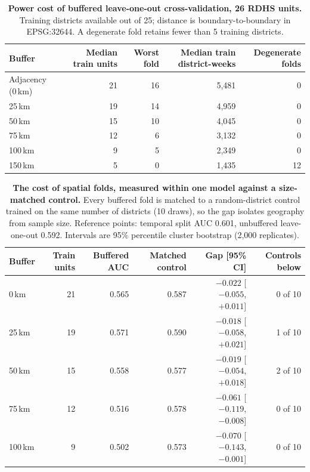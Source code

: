 \documentclass[11pt,a4paper]{article}
\begin{document}
\begin{table}[htbp]
\centering
\caption{\textbf{Power cost of buffered leave-one-out cross-validation, 26 RDHS units.} Training districts available out of 25; distance is boundary-to-boundary in EPSG:32644. A degenerate fold retains fewer than 5 training districts.}
\label{tab:wp4-power}
{\footnotesize\begin{tabular}{@{}lrrrr@{}}
\toprule
Buffer & Median train units & Worst fold & Median train district-weeks & Degenerate folds \\
\midrule
Adjacency (0\,km) & 21 & 16 & 5{,}481 & 0 \\
25\,km            & 19 & 14 & 4{,}959 & 0 \\
50\,km            & 15 & 10 & 4{,}045 & 0 \\
75\,km            & 12 & 6  & 3{,}132 & 0 \\
100\,km           & 9  & 5  & 2{,}349 & 0 \\
150\,km           & 5  & 0  & 1{,}435 & 12 \\
\bottomrule
\end{tabular}}
\end{table}

\begin{table}[htbp]
\centering
\caption{\textbf{The cost of spatial folds, measured within one model against a size-matched control.} Every buffered fold is matched to a random-district control trained on the same number of districts (10 draws), so the gap isolates geography from sample size. Reference points: temporal split AUC 0.601, unbuffered leave-one-out 0.592. Intervals are 95\% percentile cluster bootstrap (2{,}000 replicates).}
\label{tab:wp4-fold}
{\footnotesize\begin{tabular}{@{}lrrrrr@{}}
\toprule
Buffer & Train units & Buffered AUC & Matched control & Gap [95\% CI] & Controls below \\
\midrule
0\,km   & 21 & 0.565 & 0.587 & $-0.022$ [$-0.055$, $+0.011$] & 0 of 10 \\
25\,km  & 19 & 0.571 & 0.590 & $-0.018$ [$-0.058$, $+0.021$] & 1 of 10 \\
50\,km  & 15 & 0.558 & 0.577 & $-0.019$ [$-0.054$, $+0.018$] & 2 of 10 \\
75\,km  & 12 & 0.516 & 0.578 & $-0.061$ [$-0.119$, $-0.008$] & 0 of 10 \\
100\,km & 9  & 0.502 & 0.573 & $-0.070$ [$-0.143$, $-0.001$] & 0 of 10 \\
\bottomrule
\end{tabular}}
\end{table}
\end{document}
